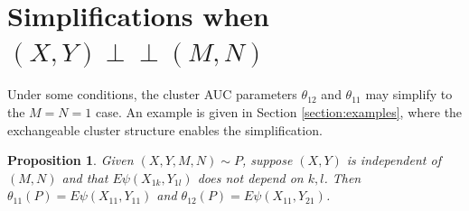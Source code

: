 \documentclass[12pt]{article}
\DeclareMathOperator{\AUC}{AUC}
\newcommand{\E}{E}
\renewcommand{\P}{P}
\newcommand{\cind}{\perp \!\!\! \perp}
\newcommand{\aucindiv}{\theta_{11}}%
\newcommand{\aucpop}{\theta_{12}}%
\newcommand{\kernel}{\psi}
\newtheorem{proposition}[theorem]{Proposition}
\begin{document}
\section{Simplifications when $(X,Y)\cind (M,N)$}\label{section:simplifications}

Under some conditions, the cluster AUC parameters $\aucpop$ and
$\aucindiv$ may simplify to the $M=N=1$ case. An example is given in
Section \ref{section:examples}, where the exchangeable cluster structure
enables the simplification.
\begin{proposition}\label{proposition:reduction} Given $(X,Y,M,N)\sim \P$, suppose $(X,Y)$ is independent of $(M,N)$ and that $\E\kernel(X_{1k},Y_{1l})$ does not depend on $k,l$. Then $\aucindiv(\P)=\E\kernel(X_{11},Y_{11})$ and $\aucpop(\P)=\E\kernel(X_{11},Y_{21})$.
\end{proposition}


\end{document}
